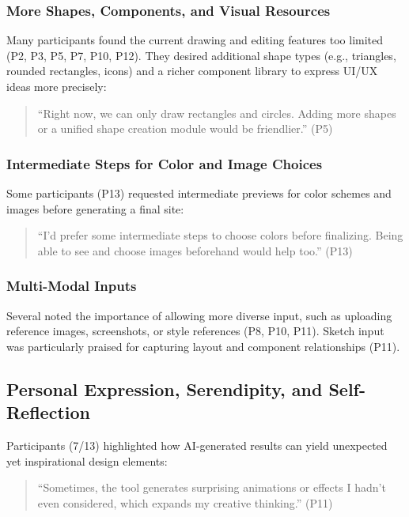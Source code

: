 \subsubsection{More Shapes, Components, and Visual Resources}
Many participants found the current drawing and editing features too limited (P2, P3, P5, P7, P10, P12). They desired additional shape types (e.g., triangles, rounded rectangles, icons) and a richer component library to express UI/UX ideas more precisely:

\begin{quote}
``Right now, we can only draw rectangles and circles. Adding more shapes or a unified shape creation module would be friendlier.'' (P5)
\end{quote}

\subsubsection{Intermediate Steps for Color and Image Choices}
Some participants (P13) requested intermediate previews for color schemes and images before generating a final site:

\begin{quote}
``I'd prefer some intermediate steps to choose colors before finalizing. Being able to see and choose images beforehand would help too.'' (P13)
\end{quote}

\subsubsection{Multi-Modal Inputs}
Several noted the importance of allowing more diverse input, such as uploading reference images, screenshots, or style references (P8, P10, P11). Sketch input was particularly praised for capturing layout and component relationships (P11).

\subsection{Personal Expression, Serendipity, and Self-Reflection}
Participants (7/13) highlighted how AI-generated results can yield unexpected yet inspirational design elements:

\begin{quote}
``Sometimes, the tool generates surprising animations or effects I hadn't even considered, which expands my creative thinking.'' (P11)
\end{quote}

